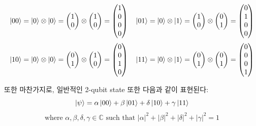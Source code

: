 \[
    \ket{00} = \ket{0} \otimes \ket{0} = \begin{pmatrix} 1 \\ 0 \end{pmatrix} \otimes \begin{pmatrix} 1 \\ 0 \end{pmatrix} = \begin{pmatrix} 1 \\ 0 \\ 0 \\ 0 \end{pmatrix} \quad
    \ket{01} = \ket{0} \otimes \ket{1} = \begin{pmatrix} 1 \\ 0 \end{pmatrix} \otimes \begin{pmatrix} 0 \\ 1 \end{pmatrix} = \begin{pmatrix} 0 \\ 1 \\ 0 \\ 0 \end{pmatrix}
\]
\[
    \ket{10} = \ket{0} \otimes \ket{0} = \begin{pmatrix} 0 \\ 1 \end{pmatrix} \otimes \begin{pmatrix} 1 \\ 0 \end{pmatrix} = \begin{pmatrix} 0 \\ 0 \\ 1 \\ 0 \end{pmatrix} \quad
    \ket{11} = \ket{0} \otimes \ket{1} = \begin{pmatrix} 0 \\ 1 \end{pmatrix} \otimes \begin{pmatrix} 0 \\ 1 \end{pmatrix} = \begin{pmatrix} 0 \\ 0 \\ 0 \\ 1 \end{pmatrix}
\]

또한 마찬가지로, 일반적인 2-qubit state 또한 다음과 같이 표현된다:
\[
    \ket{\psi} = \alpha \ket{00} + \beta \ket{01} + \delta \ket{10} + \gamma \ket{11}
\]
\[
    \text{where } \alpha, \beta, \delta, \gamma \in \mathbb{C} \text{ such that } |\alpha|^2 + |\beta|^2 + |\delta|^2 + |\gamma|^2 = 1
\]

